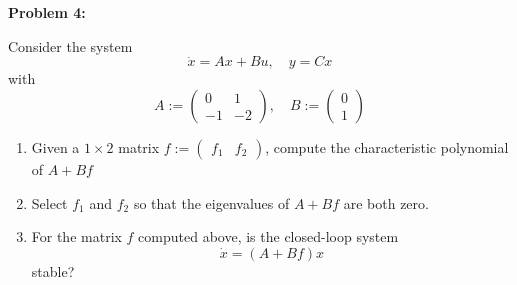 \documentclass[12pt]{article}
\newenvironment{problem}[1]{
    \textbf{Problem #1:}
}{
    \rmfamily \vspace{1em}
}
\begin{document}
\newpage

\begin{problem}{4}
    Consider the system
    \[
        \dot x = Ax + Bu, \quad y = Cx
    \]
    with
    \[
        A := \begin{pmatrix}
            0 & 1\\
            -1 & -2 \end{pmatrix}, \quad B := \begin{pmatrix}
                0\\
                1
            \end{pmatrix}
    \]
    \begin{enumerate}[label=(\alph*)]
        \item Given a \(1 \times 2\) matrix \(f:= \begin{pmatrix}
            f_1 & f_2
        \end{pmatrix}\), compute the characteristic polynomial of \(A + Bf\)
        \item Select \(f_1\) and \(f_2\) so that the eigenvalues of \(A + Bf\) are both zero.
        \item For the matrix \(f\) computed above, is the closed-loop system
        \[
            \dot x = (A + Bf)x
        \]
        stable?
    \end{enumerate}
\end{problem}
\end{document}
